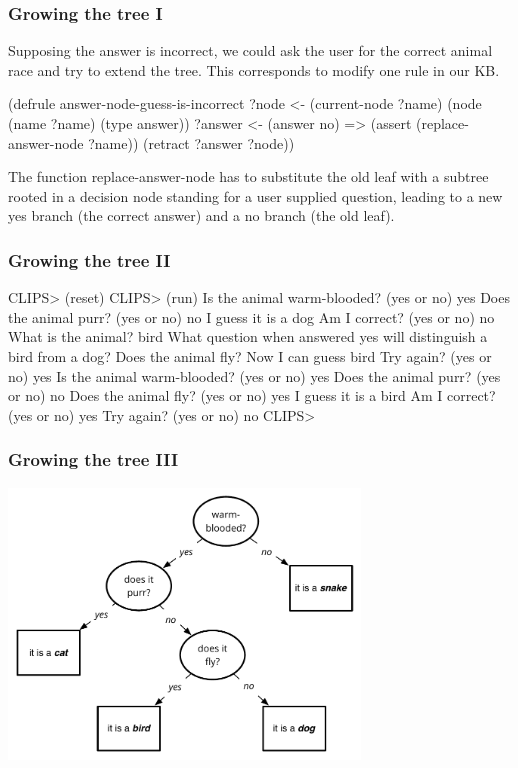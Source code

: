 \documentclass[xcolor={usenames,dvipsnames,svgnames}, compress]{beamer}
\begin{document}
\begin{frame}[fragile]
  \frametitle{Growing the tree I}
  Supposing the answer is incorrect, we could ask the user for the
  correct animal race and try to extend the tree. This corresponds to
  modify one rule in our KB.
  \begin{clips-code}[numbers=none]
    (defrule answer-node-guess-is-incorrect
        ?node <- (current-node ?name)
        (node (name ?name) (type answer))
        ?answer <- (answer no)
        =>
        (assert (replace-answer-node ?name))
        (retract ?answer ?node))
  \end{clips-code}
  The function \textsf{replace-answer-node} has to substitute the old
  leaf with a subtree rooted in a decision node standing for a user
  supplied question, leading to a new yes branch (the correct answer)
  and a no branch (the old leaf).
      
\end{frame}

\begin{frame}[fragile]
  \frametitle{Growing the tree II}
  
  \begin{clips-code}
    CLIPS> (reset)
    CLIPS> (run)
    Is the animal warm-blooded? (yes or no) yes
    Does the animal purr? (yes or no) no
    I guess it is a dog
    Am I correct? (yes or no) no
    What is the animal? bird
    What question when answered yes will distinguish 
    a bird from a dog? Does the animal fly?
    Now I can guess bird
    Try again? (yes or no) yes
    Is the animal warm-blooded? (yes or no) yes
    Does the animal purr? (yes or no) no
    Does the animal fly? (yes or no) yes
    I guess it is a bird
    Am I correct? (yes or no) yes
    Try again? (yes or no) no
    CLIPS> 
  \end{clips-code}
  
\end{frame}

\begin{frame}
  \frametitle{Growing the tree III}
  \begin{center}
    \includegraphics[width=0.7\textwidth]{Figures/dectree-2}
  \end{center}
\end{frame}
\end{document}
